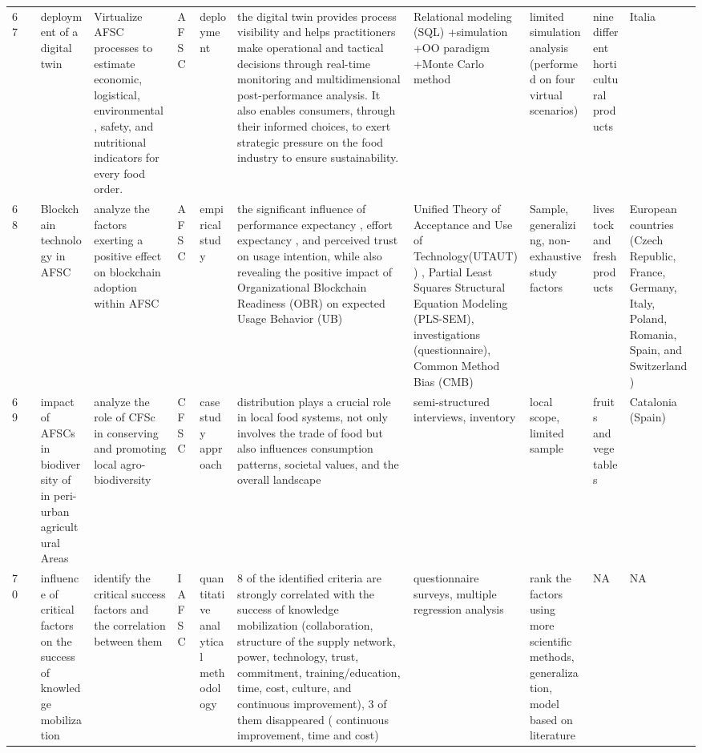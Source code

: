\documentclass[a4paper,10pt]{article}
\begin{document}
\begin{landscape}
\begin{small}
\begin{longtable}{p{0.5cm} p{2cm} p{2.5cm} p{4cm} p{1cm} p{2.5cm} p{5.5cm} p{2.5cm} p{2.5cm} p{1.8cm} p{1.5cm}}
67 & \textcite{Guidani46}  & deployment of a digital twin &Virtualize AFSC processes to estimate economic, logistical, environmental, safety, and nutritional indicators for every food order. & AFSC&deployment & the digital twin provides process visibility and helps practitioners make operational and tactical decisions through real-time monitoring and multidimensional post-performance analysis. It also enables consumers, through their informed choices, to exert strategic pressure on the food industry to ensure sustainability.& Relational modeling (SQL) +simulation +OO paradigm +Monte Carlo method  & limited simulation analysis (performed on four virtual scenarios) & nine different horticultural products& Italia  \\
68 & \textcite{Toader49}  & Blockchain technology in AFSC&analyze the factors exerting a positive effect on blockchain adoption within AFSC & AFSC & empirical study &the significant influence of performance expectancy , effort expectancy , and perceived trust on usage intention, while also revealing the positive impact of Organizational Blockchain Readiness (OBR) on expected Usage Behavior (UB) &Unified Theory of Acceptance and Use of Technology(UTAUT)) , Partial Least Squares Structural Equation Modeling (PLS-SEM), investigations (questionnaire), Common Method Bias (CMB)& Sample, generalizing, non-exhaustive study factors & livestock and fresh products&  European countries (Czech Republic, France, Germany, Italy, Poland, Romania, Spain, and Switzerland)\\
69 & \textcite{Marin50}  & impact of AFSCs in biodiversity of in peri-urban agricultural Areas& analyze the role of CFSc in conserving and promoting local agro-biodiversity  & CFSC  & case study approach&distribution plays a crucial role in local food systems, not only involves the trade of food but also influences consumption patterns, societal values, and the overall landscape & semi-structured interviews, inventory& local scope, limited sample & fruits and vegetables& Catalonia (Spain) \\
70 & \textcite{Chen51}  & influence of critical factors on the success of knowledge mobilization& identify  the critical success factors and the correlation between them & IAFSC & quantitative analytical methodology& 8 of the identified criteria are strongly correlated with the success of knowledge mobilization (collaboration, structure of the supply network, power, technology, trust, commitment, training/education, time, cost, culture, and continuous improvement), 3 of them disappeared ( continuous improvement, time and cost)  & questionnaire surveys, multiple regression analysis  & rank the factors using more scientific methods, generalization, model based on literature& NA& NA \\

\end{longtable}
\end{small}
\end{landscape}
\end{document}
